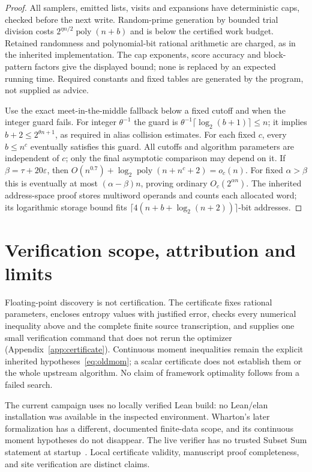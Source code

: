\documentclass[11pt]{article}
\theoremstyle{remark}\newtheorem*{remark}{Scope}
\newcommand{\eps}{\varepsilon}
\newcommand{\poly}{\operatorname{poly}}
\begin{document}
\begin{proof}
All samplers, emitted lists, visits and expansions have deterministic
caps, checked before the next write. Random-prime generation by bounded
trial division costs $2^{\eta n/2}\poly(n+b)$ and is below the certified
work budget. Retained randomness and polynomial-bit rational arithmetic
are charged, as in the inherited implementation. The cap exponents,
score accuracy and block-pattern factors give the displayed bound;
none is replaced by an expected running time. Required constants and
fixed tables are generated by the program, not supplied as advice.

Use the exact meet-in-the-middle fallback below a fixed cutoff and
when the integer guard fails. For integer $\theta^{-1}$ the guard is
$\theta^{-1}\lceil\log_2(b+1)\rceil\le n$; it implies
$b+2\le2^{\theta n+1}$, as required in alias collision estimates.
For each fixed $c$, every $b\le n^c$ eventually satisfies this guard.
All cutoffs and algorithm parameters are independent of $c$; only the
final asymptotic comparison may depend on it. If $\beta=\tau+20\eps$,
then $O(n^{0.7})+\log_2\poly(n+n^c+2)=o_c(n)$.
For fixed $\alpha>\beta$ this is eventually at most $(\alpha-\beta)n$,
proving ordinary $O_c(2^{\alpha n})$. The inherited address-space proof
stores multiword operands and counts each allocated word; its logarithmic
storage bound fits $\lceil4(n+b+\log_2(n+2))\rceil$-bit addresses.
\end{proof}

\section{Verification scope, attribution and limits}
Floating-point discovery is not certification. The certificate fixes rational parameters, encloses entropy values with justified error, checks every numerical inequality above and the complete finite source transcription, and supplies one small verification command that does not rerun the optimizer (Appendix~\ref{app:certificate}). Continuous moment inequalities remain
the explicit inherited hypotheses~\eqref{eq:oldmom}; a scalar certificate
does not establish them or the whole upstream algorithm. No claim of
framework optimality follows from a failed search.

The current campaign uses no locally verified Lean build: no Lean/elan
installation was available in the inspected environment. Wharton's
later formalization has a different, documented finite-data scope, and
its continuous moment hypotheses do not disappear. The live verifier
has no trusted Subset Sum statement at startup~\cite{rules}.
Local certificate validity, manuscript proof completeness, and site
verification are distinct claims.
\end{document}
